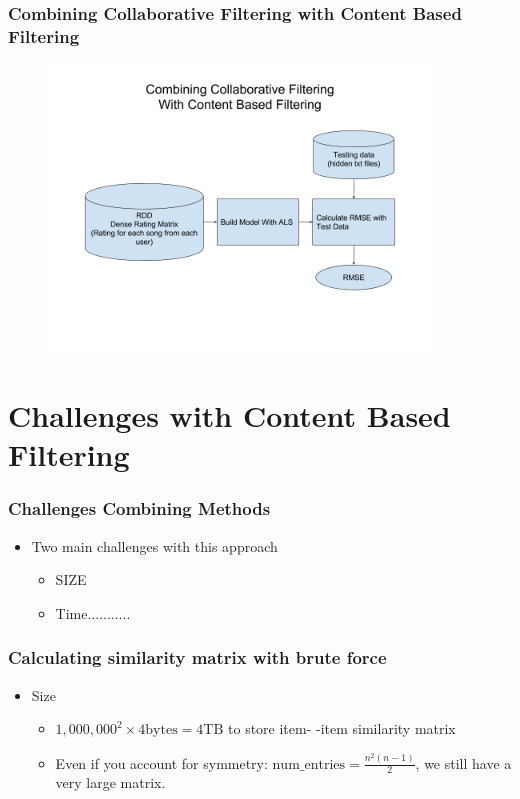 \documentclass[11pt]{beamer}
\begin{document}
  \begin{frame}
    \frametitle{Combining Collaborative Filtering with Content Based Filtering}
    \begin{figure}[h]
      \centering
      \includegraphics[width=4in]{figures/collab_plus_content.png}
      \label{fig:collab_plus_content.png}
    \end{figure}
  \end{frame}


  \section{Challenges with Content Based Filtering}
  \begin{frame}
    \frametitle{Challenges Combining Methods}
    \begin{itemize}
      \item Two main challenges with this approach
        \begin{itemize}
          \item SIZE
          \item Time...........
        \end{itemize}
    \end{itemize}
  \end{frame}

  \begin{frame}
    \frametitle{Calculating similarity matrix with brute force}
    \begin{itemize}
      \item Size
        \begin{itemize}
          \item $1,000,000^2 \times 4\text{bytes} = 4\text{TB}$ to store item-
          -item similarity matrix
          \item Even if you account for symmetry: $\text{num\_entries} = \frac{n^2(n-1)}{2}$,
          we still have a very large matrix.
        \end{itemize}
    \end{itemize}
  \end{frame}
\end{document}
